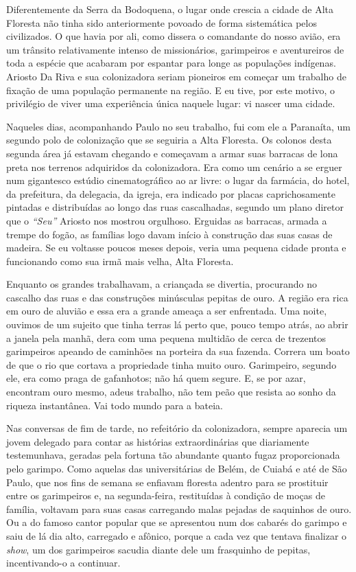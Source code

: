 Diferentemente da Serra da Bodoquena, o lugar onde crescia a cidade de Alta Floresta não tinha sido anteriormente povoado de forma sistemática pelos civilizados.
O que havia por ali, como dissera o comandante do nosso avião, era um trânsito relativamente intenso de missionários, garimpeiros e aventureiros de toda a espécie que acabaram por espantar para longe as populações indígenas.
Ariosto Da Riva e sua colonizadora seriam pioneiros em começar um trabalho de fixação de uma população permanente na região.
E eu tive, por este motivo, o privilégio de viver uma experiência única naquele lugar: vi nascer uma cidade.

 Naqueles dias, acompanhando Paulo no seu trabalho, fui com ele a Paranaíta, um segundo polo de colonização que se seguiria a Alta Floresta.
Os colonos desta segunda área já estavam chegando e começavam a armar suas barracas de lona preta nos terrenos adquiridos da colonizadora.
Era como um cenário a se erguer num gigantesco estúdio cinematográfico ao ar livre: o lugar da farmácia, do hotel, da prefeitura, da delegacia, da igreja, era indicado por placas caprichosamente pintadas e distribuídas ao longo das ruas cascalhadas, segundo um plano diretor que o \textit{``Seu''} Ariosto nos mostrou orgulhoso.
Erguidas as barracas, armada a trempe do fogão, as famílias logo davam início à construção das suas casas de madeira.
Se eu voltasse poucos meses depois, veria uma pequena cidade pronta e funcionando como sua irmã mais velha, Alta Floresta.

Enquanto os grandes trabalhavam, a criançada se divertia, procurando no cascalho das ruas e das construções minúsculas pepitas de ouro.
A região era rica em ouro de aluvião e essa era a grande ameaça a ser enfrentada.
Uma noite, ouvimos de um sujeito que tinha terras lá perto que, pouco tempo atrás, ao abrir a janela pela manhã, dera com uma pequena multidão de cerca de trezentos garimpeiros apeando de caminhões na porteira da sua fazenda.
Correra um boato de que o rio que cortava a propriedade tinha muito ouro.
Garimpeiro, segundo ele, era como praga de gafanhotos; não há quem segure.
E, se por azar, encontram ouro mesmo, adeus trabalho, não tem peão que resista ao sonho da riqueza instantânea.
Vai todo mundo para a bateia.


Nas conversas de fim de tarde, no refeitório da colonizadora, sempre aparecia um jovem delegado para contar as histórias extraordinárias que diariamente testemunhava, geradas pela fortuna tão abundante quanto fugaz proporcionada pelo garimpo.
Como aquelas das universitárias de Belém, de Cuiabá e até de São Paulo, que nos fins de semana se enfiavam floresta adentro para se prostituir entre os garimpeiros e, na segunda-feira, restituídas à condição de moças de família, voltavam para suas casas carregando malas pejadas de saquinhos de ouro.
Ou a do famoso cantor popular que se apresentou num dos cabarés do garimpo e saiu de lá dia alto, carregado e afônico, porque a cada vez que tentava finalizar o \textit{show}, um dos garimpeiros sacudia diante dele um frasquinho de pepitas, incentivando-o a continuar.

